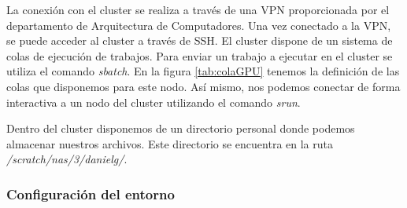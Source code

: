 La conexión con el cluster se realiza a través de una VPN proporcionada por el departamento
de Arquitectura de Computadores. Una vez conectado a la VPN, se puede acceder al cluster
a través de SSH. El cluster dispone de un sistema de colas de ejecución de trabajos. Para
enviar un trabajo a ejecutar en el cluster se utiliza el comando \textit{sbatch}. En la figura
\ref{tab:colaGPU} tenemos la definición de las colas que disponemos para este nodo. Así mismo,
nos podemos conectar de forma interactiva a un nodo del cluster utilizando el comando
\textit{srun}.

\begin{table}[H]
    \centering
    \caption[Colas definidas en el nodo de GPU's]{Colas definidas en el nodo de GPU's (Elaboración propia)}
    \label{tab:colaGPU}
\end{table}

Dentro del cluster disponemos de un directorio personal donde podemos almacenar nuestros
archivos. Este directorio se encuentra en la ruta \textit{/scratch/nas/3/danielg/}.

\subsubsection{Configuración del entorno}
\label{subsubsec:configuracion_entorno}

